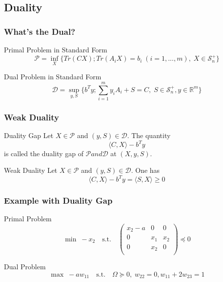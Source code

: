 \documentclass[11pt]{beamer}
\begin{document}
\subsection{Duality}
	\begin{frame}
		\frametitle{What's the Dual?}
		\begin{block}{Primal Problem in Standard Form}
			\begin{equation*}
			\mathcal{P}=\inf_X\{Tr(CX);Tr(A_iX)=b_i\;(i=1,...,m),\;X\in \mathcal{S}^+_n\}
			\end{equation*}
		\end{block}
		\begin{block}{Dual Problem in Standard Form}
			\begin{equation*}
			\mathcal{D}=\sup_{y,S}\{b^Ty;\sum_{i=1}^{m}y_iA_i+S=C,\;S\in \mathcal{S}^+_n,y\in\mathbb{R}^m\}
			\end{equation*}
		\end{block}
	\end{frame}
	\begin{frame}
		\frametitle{Weak Duality}
		\begin{block}{Duality Gap}
			Let $X\in\mathcal{P}$ and $(y,S)\in\mathcal{D}$. The quantity
			\begin{equation*}
				\langle C,X \rangle-b^Ty
			\end{equation*}
			is called the duality gap of $\mathcal{P} and \mathcal{D}$ at $(X,y,S)$.
		\end{block}
		\begin{block}{Weak Duality}
			Let $X\in\mathcal{P}$ and $(y,S)\in\mathcal{D}$. One has
			\begin{equation*}
			\langle C,X \rangle-b^Ty=\langle S,X \rangle\geq 0
			\end{equation*}
		\end{block}
	\end{frame}
	\begin{frame}
		\frametitle{Example with Duality Gap}
		\begin{block}{Primal Problem}
			\begin{equation*}
			\min\;-x_2\quad\text{s.t.}\quad\begin{pmatrix}
			x_2-a & 0 & 0\\
			0 & x_1 & x_2\\
			0 & x_2 & 0\\
			\end{pmatrix}\preceq 0
			\end{equation*}
		\end{block}
		\begin{block}{Dual Problem}
			\begin{equation*}
			\max\;-aw_{11}\quad\text{s.t.}\quad\Omega\succeq 0,\;w_{22}=0, w_{11}+2w_{23}=1
			\end{equation*}
		\end{block}
	\end{frame}
\end{document}
